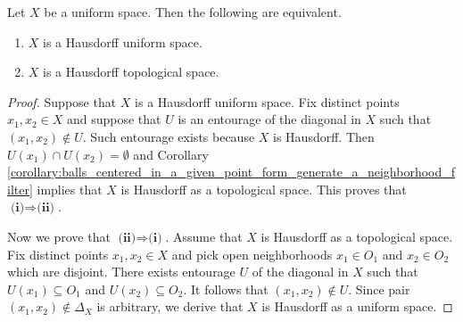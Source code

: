 \begin{fact}\label{fact:Hausdorff_uniform_space_is_Hausdorff_as_a_topological_space}
	Let $X$ be a uniform space. Then the following are equivalent.
	\begin{enumerate}[label=\emph{\textbf{(\arabic*)}}, leftmargin=3.0em]
		\item $X$ is a Hausdorff uniform space.
		\item $X$ is a Hausdorff topological space.
	\end{enumerate}
\end{fact}
\begin{proof}
	Suppose that $X$ is a Hausdorff uniform space. Fix distinct points $x_1,x_2 \in X$ and suppose that $U$ is an entourage of the diagonal in $X$ such that $(x_1,x_2) \not \in U$. Such entourage exists because $X$ is Hausdorff. Then $U(x_1)\cap U(x_2) = \emptyset$ and Corollary \ref{corollary:balls_centered_in_a_given_point_form_generate_a_neighborhood_filter} implies that $X$ is Hausdorff as a topological space. This proves that $\textbf{(i)}\Rightarrow \textbf{(ii)}$.

	Now we prove that $\textbf{(ii)}\Rightarrow \textbf{(i)}$. Assume that $X$ is Hausdorff as a topological space. Fix distinct points $x_1,x_2 \in X$ and pick open neighborhoods $x_1 \in O_1$ and $x_2 \in O_2$ which are disjoint. There exists entourage $U$ of the diagonal in $X$ such that $U(x_1) \subseteq O_1$ and $U(x_2) \subseteq O_2$. It follows that $(x_1,x_2) \not \in U$. Since pair $(x_1,x_2) \not \in \Delta_X$ is arbitrary, we derive that $X$ is Hausdorff as a uniform space.
\end{proof}


